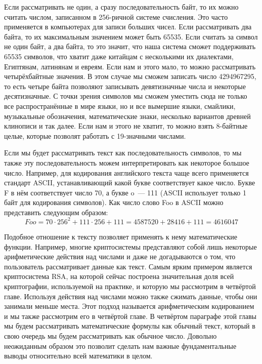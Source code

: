 Если рассматривать не один, а сразу последовательность байт, то их можно считать числом, записанном в 256-ричной системе счисления. Это часто применяется в компьютерах для записи больших чисел. Если рассматривать два байта, то их максимальным значением может быть 65535. Если считать за символ не один байт, а два байта, то это значит, что наша система сможет поддерживать 65535 символов, что хватит даже китайцам с несколькими их диалектами, Египтянам, латинянам и евреям. Если нам и этого мало, то можно рассматривать четырёхбайтные значения. В этом случае мы сможем записать число 4294967295, то есть четыре байта позволяют записывать девятизначные числа и некоторые десятизначные. С точки зрения символов мы сможем уместить сюда не только все распространённые в мире языки, но и все вымершие языки, смайлики, музыкальные обозначения, математические знаки, несколько вариантов древней клинописи и так далее. Если нам и этого не хватит, то можно взять 8-байтные целые, которые позволят работать с 19-значными числами.

Если мы будет рассматривать текст как последовательность символов, то мы также эту последовательность можем интерпретировать как некоторое большое число. Например, для кодирования английского текста чаще всего применяется стандарт ASCII, устанавливающий какой букве соответствует какое число. Букве F в нём соответствует число 70, а букве o~— 111 (ASCII использует только 1 байт для кодирования символов). Как число слово Foo в ASCII можно представить следующим образом:
$$Foo = 70 \cdot 256^2 + 111 \cdot 256 + 111 = 4587520 + 28416 + 111 = 4616047$$

Подобное отношение к тексту позволяет применять к нему математические функции. Например, многие криптосистемы представляют собой лишь некоторые арифметические действия над числами и даже не догадываются о том, что пользователь рассматривает данные как текст. Самым ярким примером является криптосистема RSA, на которой сейчас построена значительная доля всей криптографии, используемой на практике, и которую мы рассмотрим в четвёртой главе. Используя действия над числами можно также сжимать данные, чтобы они занимали меньше места. Этот подход называется арифметическим кодированием и мы также рассмотрим его в четвёртой главе. В четвёртом параграфе этой главы мы будем рассматривать математические формулы как обычный текст, который в свою очередь мы будем рассматривать как обычное число. Довольно неожиданным образом это позволит сделать нам важные фундаментальные выводы относительно всей математики в целом.

